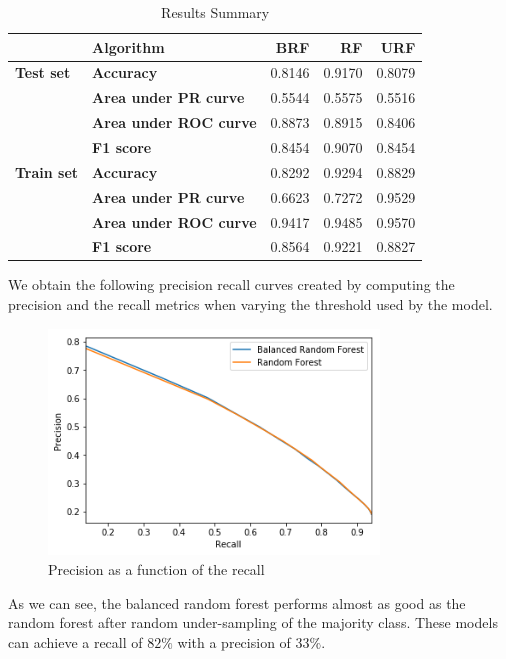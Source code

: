 \documentclass[conference]{IEEEtran}
\begin{document}
\begin{table}[htbp]
\caption{Results Summary}
\begin{center}
\begin{tabular}{|l|l|r|r|r|}
\hline
          & \textbf{Algorithm} &     BRF &      RF &     URF \\
\hline
\textbf{Test set} & \textbf{Accuracy} &  0.8146 &  0.9170 &  0.8079 \\
          & \textbf{Area under PR curve} &  0.5544 &  0.5575 &  0.5516 \\
          & \textbf{Area under ROC curve} &  0.8873 &  0.8915 &  0.8406 \\
          & \textbf{F1 score} &  0.8454 &  0.9070 &  0.8454 \\
\hline
\textbf{Train set} & \textbf{Accuracy} &  0.8292 &  0.9294 &  0.8829 \\
          & \textbf{Area under PR curve} &  0.6623 &  0.7272 &  0.9529 \\
          & \textbf{Area under ROC curve} &  0.9417 &  0.9485 &  0.9570 \\
          & \textbf{F1 score} &  0.8564 &  0.9221 &  0.8827 \\
\hline
\end{tabular}
\label{result summary}
\end{center}
\end{table}

We obtain the following precision recall curves created by computing the precision and the recall metrics when varying the threshold used by the model.

\begin{figure}[htbp]
\centerline{\includegraphics[height=6cm, keepaspectratio]{figures/pr_brf_and_rf.png}}
\caption{Precision as a function of the recall}
\label{precision recall rf}
\end{figure}

As we can see, the balanced random forest performs almost as good as the random forest after random under-sampling of the majority class. These models can achieve a recall of $82\%$ with a precision of $33\%$.
\end{document}
